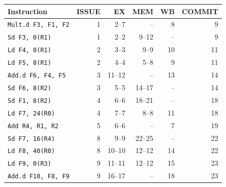 \begin{tabular}{@{}lrrrrr@{}}\toprule
Instruction & ISSUE & EX & MEM & WB & COMMIT\\\midrule
\texttt{Mult.d F3, F1, F2} & 1 & 2--7 & -- & 8 & 9 \\
\texttt{Sd F3, 0(R1)} & 1 & 2--2 & 9--12 & -- & 9 \\
\texttt{Ld F4, 0(R1)} & 2 & 3--3 & 9--9 & 10 & 11 \\
\texttt{Ld F5, 8(R1)} & 2 & 4--4 & 5--8 & 9 & 11 \\
\texttt{Add.d F6, F4, F5} & 3 & 11--12 & -- & 13 & 14 \\
\texttt{Sd F6, 8(R2)} & 3 & 5--5 & 14--17 & -- & 14 \\
\texttt{Sd F1, 8(R2)} & 4 & 6--6 & 18--21 & -- & 18 \\
\texttt{Ld F7, 24(R0)} & 4 & 7--7 & 8--8 & 11 & 18 \\
\texttt{Add R4, R1, R2} & 5 & 6--6 & -- & 7 & 19 \\
\texttt{Sd F7, 16(R4)} & 8 & 9--9 & 22--25 & -- & 22 \\
\texttt{Ld F8, 40(R0)} & 8 & 10--10 & 12--12 & 14 & 22 \\
\texttt{Ld F9, 0(R3)} & 9 & 11--11 & 12--12 & 15 & 23 \\
\texttt{Add.d F10, F8, F9} & 9 & 16--17 & -- & 18 & 23 \\
\bottomrule\end{tabular}